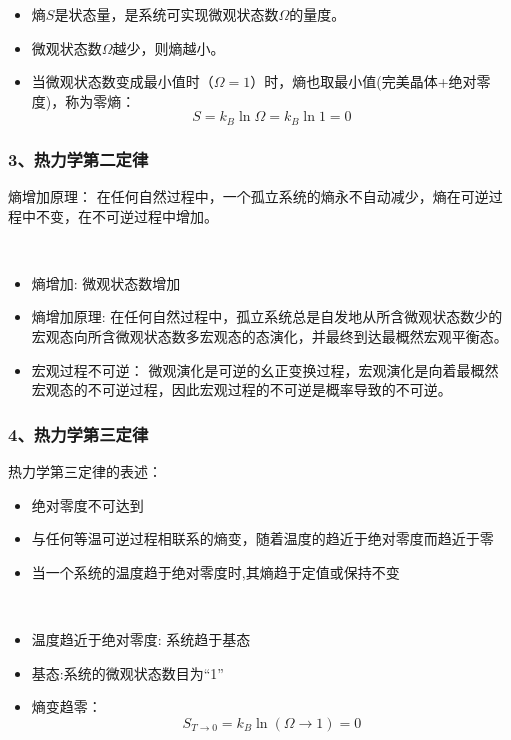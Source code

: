 \begin{frame}
  \frametitle{}
  \emf[统计诠释:] 
  \begin{itemize}
    \item 熵$S$是状态量，是系统可实现微观状态数$\Omega$的量度。
    \item 微观状态数$\Omega$越少，则熵越小。 
    \item 当微观状态数变成最小值时（$\Omega =1$）时，熵也取最小值(完美晶体+绝对零度)，称为零熵： 
    \[S = k_B \ln \Omega = k_B \ln 1 =0\] 
  \end{itemize}
\end{frame} 

\begin{frame}
  \frametitle{ 3、热力学第二定律}
 熵增加原理： 在任何自然过程中，一个孤立系统的熵永不自动减少，熵在可逆过程中不变，在不可逆过程中增加。

 ~~\\ 
 \emf[统计诠释:] 
  \begin{itemize}
    \item 熵增加: 微观状态数增加
    \item 熵增加原理: 在任何自然过程中，孤立系统总是自发地从所含微观状态数少的宏观态向所含微观状态数多宏观态的态演化，并最终到达最概然宏观平衡态。
    \item 宏观过程不可逆： 微观演化是可逆的幺正变换过程，宏观演化是向着最概然宏观态的不可逆过程，因此宏观过程的不可逆是概率导致的不可逆。
  \end{itemize}
\end{frame} 

\begin{frame}
  \frametitle{ 4、热力学第三定律}
  热力学第三定律的表述：
  \begin{itemize}
    \item 绝对零度不可达到
    \item 与任何等温可逆过程相联系的熵变，随着温度的趋近于绝对零度而趋近于零
    \item 当一个系统的温度趋于绝对零度时,其熵趋于定值或保持不变
  \end{itemize}

 ~~\\ 
 \emf[统计诠释:] 
  \begin{itemize}
    \item 温度趋近于绝对零度: 系统趋于基态
    \item 基态:系统的微观状态数目为“1”
    \item 熵变趋零：
\[S_{T \to 0} = k_B \ln (\Omega \to 1) = 0 \]
  \end{itemize}
\end{frame} 

